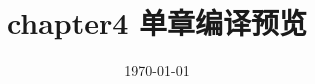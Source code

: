 \documentclass[UTF8,zihao=-4,openany]{ctexbook}
\begin{document}
\frontmatter
\title{chapter4 单章编译预览}
\author{ }
\date{\today}
\maketitle
\tableofcontents
\mainmatter
{}\label{chap:preliminaries}
\setcounter{chapter}{3}

\printbibliography
\end{document}
